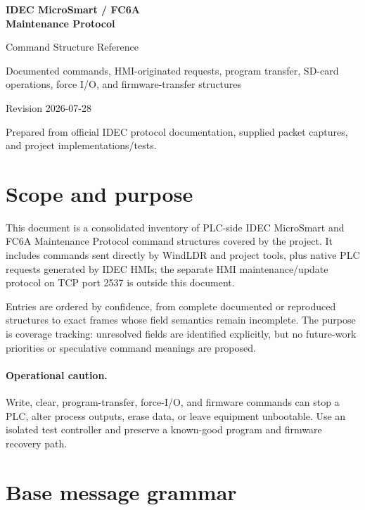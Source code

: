\documentclass[10pt,letterpaper]{article}
\begin{document}
\begin{titlepage}
\centering
\vspace*{1.2in}
{\Huge\bfseries IDEC MicroSmart / FC6A\\[0.25em]Maintenance Protocol\par}
\vspace{0.35in}
{\LARGE Command Structure Reference\par}
\vspace{0.55in}
{\large Documented commands, HMI-originated requests, program transfer, SD-card operations, force I/O, and firmware-transfer structures\par}
\vfill
{\large Revision 2026-07-28\par}
\vspace{0.2in}
{\small Prepared from official IDEC protocol documentation, supplied packet captures, and project implementations/tests.\par}
\end{titlepage}
\tableofcontents
\clearpage
{}

\section{Scope and purpose}
This document is a consolidated inventory of PLC-side IDEC MicroSmart and FC6A Maintenance Protocol command structures covered by the project. It includes commands sent directly by WindLDR and project tools, plus native PLC requests generated by IDEC HMIs; the separate HMI maintenance/update protocol on TCP port 2537 is outside this document.

Entries are ordered by confidence, from complete documented or reproduced structures to exact frames whose field semantics remain incomplete. The purpose is coverage tracking: unresolved fields are identified explicitly, but no future-work priorities or speculative command meanings are proposed.

\paragraph{Operational caution.} Write, clear, program-transfer, force-I/O, and firmware commands can stop a PLC, alter process outputs, erase data, or leave equipment unbootable. Use an isolated test controller and preserve a known-good program and firmware recovery path.

\section{Base message grammar}
\end{document}
